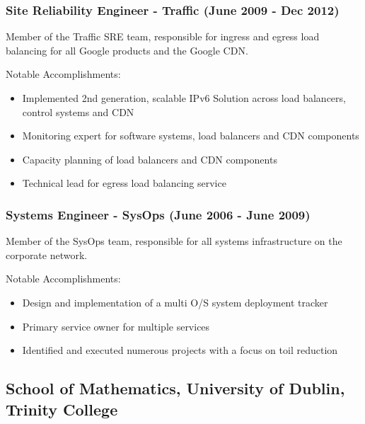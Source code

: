 \documentclass[a4paper, 10pt] {article}
\begin{document}
\subsubsection*{Site Reliability Engineer - Traffic (June 2009 - Dec 2012)}

Member of the Traffic SRE team, responsible for ingress and egress load balancing for all Google products and the Google CDN. 

\vspace{4mm}  %

Notable Accomplishments:

\begin{itemize}[itemsep=2pt,parsep=2pt]
  \item Implemented 2nd generation, scalable IPv6 Solution across load balancers, control systems and CDN
  \item Monitoring expert for software systems, load balancers and CDN components 
  \item Capacity planning of load balancers and CDN components
  \item Technical lead for egress load balancing service
\end{itemize}

\subsubsection*{Systems Engineer - SysOps (June 2006 - June 2009)}

Member of the SysOps team, responsible for all systems infrastructure on the corporate network.

\vspace{4mm}  %

Notable Accomplishments:

\begin{itemize}[itemsep=2pt,parsep=2pt]
  \item Design and implementation of a multi O/S system deployment tracker
  \item Primary service owner for multiple services
  \item Identified and executed numerous projects with a focus on toil reduction
\end{itemize}

\subsection*{School of Mathematics, University of Dublin, Trinity College}
\end{document}
